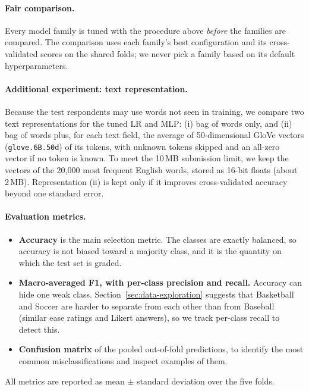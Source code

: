 \documentclass[11pt,letterpaper]{article}
\begin{document}
\paragraph{Fair comparison.}
Every model family is tuned with the procedure above \emph{before} the families are
compared. The comparison uses each family's best configuration and its
cross-validated scores on the shared folds; we never pick a family based on its
default hyperparameters.

\paragraph{Additional experiment: text representation.}
Because the test respondents may use words not seen in training, we compare two
text representations for the tuned LR and MLP: (i) bag of words only, and
(ii) bag of words plus, for each text field, the average of 50-dimensional GloVe
vectors \cite{pennington2014} (\texttt{glove.6B.50d}) of its tokens, with unknown
tokens skipped and an all-zero vector if no token is known. To meet the 10\,MB
submission limit, we keep the vectors of the 20{,}000 most frequent English words,
stored as 16-bit floats (about 2\,MB). Representation (ii) is kept only if it
improves cross-validated accuracy beyond one standard error.

\paragraph{Evaluation metrics.}
\begin{itemize}
\item \textbf{Accuracy} is the main selection metric. The classes are exactly
balanced, so accuracy is not biased toward a majority class, and it is the
quantity on which the test set is graded.
\item \textbf{Macro-averaged F1, with per-class precision and recall.} Accuracy can
hide one weak class. Section~\ref{sec:data-exploration} suggests that Basketball
and Soccer are harder to separate from each other than from Baseball (similar ease
ratings and Likert answers), so we track per-class recall to detect this.
\item \textbf{Confusion matrix} of the pooled out-of-fold predictions, to identify
the most common misclassifications and inspect examples of them.
\end{itemize}
All metrics are reported as mean $\pm$ standard deviation over the five folds.
\end{document}

